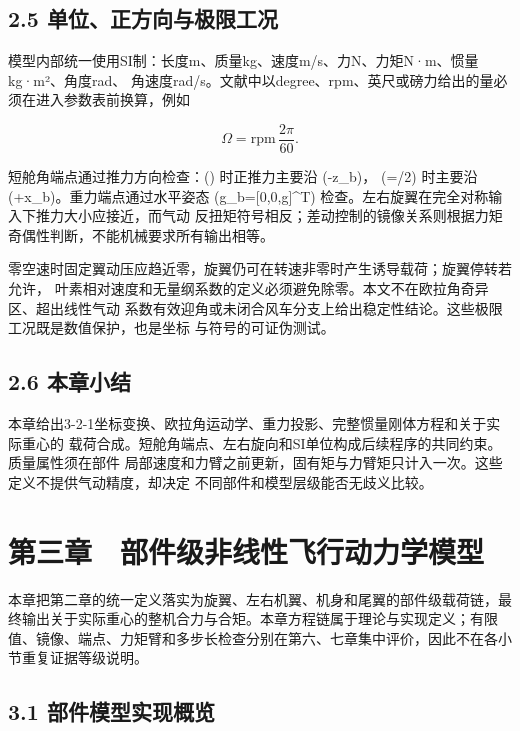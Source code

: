 \documentclass[UTF8,11pt,oneside,openany,fontset=windows]{ctexbook}
\begin{document}
\section{2.5
单位、正方向与极限工况}\label{ux5355ux4f4dux6b63ux65b9ux5411ux4e0eux6781ux9650ux5de5ux51b5}

模型内部统一使用SI制：长度m、质量kg、速度m/s、力N、力矩N·m、惯量kg·m²、角度rad、
角速度rad/s。文献中以degree、rpm、英尺或磅力给出的量必须在进入参数表前换算，例如

\[
\Omega=\mathrm{rpm}\,\frac{2\pi}{60}.
\]

短舱角端点通过推力方向检查：() 时正推力主要沿 (-z\_b)，
(\beta=\pi/2) 时主要沿 (+x\_b)。重力端点通过水平姿态
(\mathbf g\_b={[}0,0,g{]}\^{}T)
检查。左右旋翼在完全对称输入下推力大小应接近，而气动
反扭矩符号相反；差动控制的镜像关系则根据力矩奇偶性判断，不能机械要求所有输出相等。

零空速时固定翼动压应趋近零，旋翼仍可在转速非零时产生诱导载荷；旋翼停转若允许，
叶素相对速度和无量纲系数的定义必须避免除零。本文不在欧拉角奇异区、超出线性气动
系数有效迎角或未闭合风车分支上给出稳定性结论。这些极限工况既是数值保护，也是坐标
与符号的可证伪测试。

\section{2.6 本章小结}\label{ux672cux7ae0ux5c0fux7ed3}

本章给出3-2-1坐标变换、欧拉角运动学、重力投影、完整惯量刚体方程和关于实际重心的
载荷合成。短舱角端点、左右旋向和SI单位构成后续程序的共同约束。质量属性须在部件
局部速度和力臂之前更新，固有矩与力臂矩只计入一次。这些定义不提供气动精度，却决定
不同部件和模型层级能否无歧义比较。

\chapter{第三章　部件级非线性飞行动力学模型}\label{ux7b2cux4e09ux7ae0-ux90e8ux4ef6ux7ea7ux975eux7ebfux6027ux98deux884cux52a8ux529bux5b66ux6a21ux578b}

本章把第二章的统一定义落实为旋翼、左右机翼、机身和尾翼的部件级载荷链，最终输出关于实际重心的整机合力与合矩。本章方程链属于理论与实现定义；有限值、镜像、端点、力矩臂和多步长检查分别在第六、七章集中评价，因此不在各小节重复证据等级说明。

\section{3.1
部件模型实现概览}\label{ux90e8ux4ef6ux6a21ux578bux5b9eux73b0ux6982ux89c8}
\end{document}
